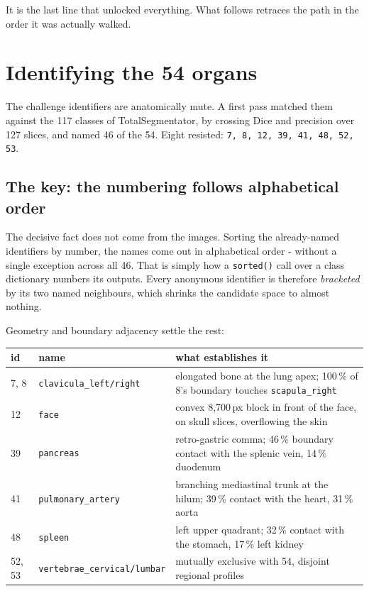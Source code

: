 \documentclass{article}
\begin{document}
\noindent It is the last line that unlocked everything. What follows retraces the
path in the order it was actually walked.

\newpage

\section{Identifying the 54 organs}
\label{sec:identify}

The challenge identifiers are anatomically mute. A first pass matched them
against the 117 classes of TotalSegmentator, by crossing Dice and precision over
127 slices, and named 46 of the 54. Eight resisted: \texttt{7, 8, 12, 39, 41,
48, 52, 53}.

\subsection{The key: the numbering follows alphabetical order}

The decisive fact does not come from the images. Sorting the already-named
identifiers by number, the names come out in alphabetical order - without a
single exception across all 46. That is simply how a \texttt{sorted()} call over
a class dictionary numbers its outputs. Every anonymous identifier is therefore
\emph{bracketed} by its two named neighbours, which shrinks the candidate space
to almost nothing.

\vspace{2.0mm}

\noindent Geometry and boundary adjacency settle the rest:

\begin{center}
\begin{tabularx}{\textwidth}{llX}
\hline
\textbf{id} & \textbf{name} & \textbf{what establishes it} \\
\hline
7, 8 & \texttt{clavicula\_left/right} & elongated bone at the lung apex; 100\,\% of 8's boundary touches \texttt{scapula\_right} \\
12 & \texttt{face} & convex 8{,}700\,px block in front of the face, on skull slices, overflowing the skin \\
39 & \texttt{pancreas} & retro-gastric comma; 46\,\% boundary contact with the splenic vein, 14\,\% duodenum \\
41 & \texttt{pulmonary\_artery} & branching mediastinal trunk at the hilum; 39\,\% contact with the heart, 31\,\% aorta \\
48 & \texttt{spleen} & left upper quadrant; 32\,\% contact with the stomach, 17\,\% left kidney \\
52, 53 & \texttt{vertebrae\_cervical/lumbar} & mutually exclusive with 54, disjoint regional profiles \\
\hline
\end{tabularx}
\end{center}
\end{document}
